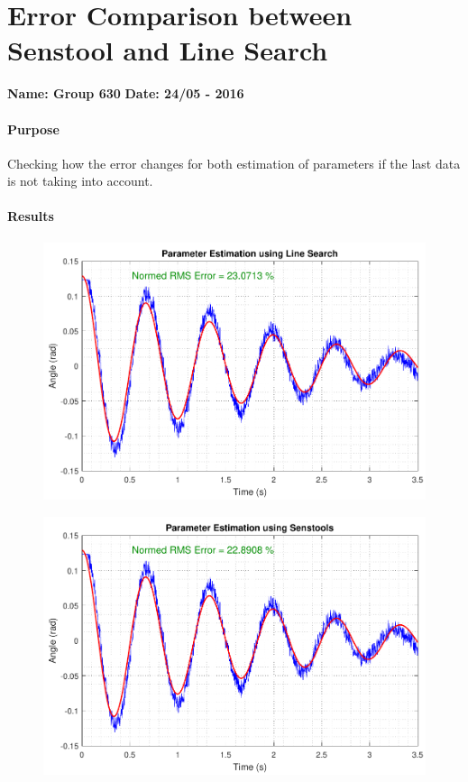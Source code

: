 \chapter{Error Comparison between Senstool and Line Search} \label{app:ErrorComp}
\textbf{Name: Group 630}
\textbf{Date: 24/05 - 2016}

\subsubsection{Purpose}
Checking how the error changes for both estimation of parameters if the last data is not taking into account.

\subsubsection{Results}
\begin{figure}[H]
		\centering
	\includegraphics[scale=.55]{figures/ErrorNoEndLineSearch}
	\label{ErrorNoEndLineSearch}
\end{figure}\vspace{-18pt}
\begin{figure}[H]
		\centering
	\includegraphics[scale=.55]{figures/ErrorNoEndSenstools}
	\label{ErrorNoEndSenstools}
\end{figure}